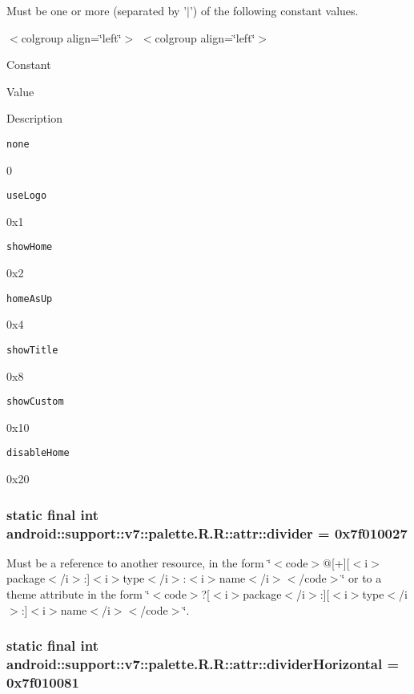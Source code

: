 Must be one or more (separated by '$|$') of the following constant values. \begin{TabularC}{0}
\hline
\end{TabularC}
$<$colgroup align=\char`\"{}left\char`\"{}$>$ $<$colgroup align=\char`\"{}left\char`\"{}$>$ 

Constant

Value

Description 

{\tt none}

0

{\tt useLogo}

0x1

{\tt showHome}

0x2

{\tt homeAsUp}

0x4

{\tt showTitle}

0x8

{\tt showCustom}

0x10

{\tt disableHome}

0x20\hypertarget{classandroid_1_1support_1_1v7_1_1palette_1_1_r_1_1attr_f76994e11ca97636ba703f13387a9aba}{
\subsubsection[{divider}]{\setlength{\rightskip}{0pt plus 5cm}static final int android::support::v7::palette.R.R::attr::divider = 0x7f010027}}
\label{classandroid_1_1support_1_1v7_1_1palette_1_1_r_1_1attr_f76994e11ca97636ba703f13387a9aba}


Must be a reference to another resource, in the form \char`\"{}$<$code$>$@\mbox{[}+\mbox{]}\mbox{[}$<$i$>$package$<$/i$>$:\mbox{]}$<$i$>$type$<$/i$>$:$<$i$>$name$<$/i$>$$<$/code$>$\char`\"{} or to a theme attribute in the form \char`\"{}$<$code$>$?\mbox{[}$<$i$>$package$<$/i$>$:\mbox{]}\mbox{[}$<$i$>$type$<$/i$>$:\mbox{]}$<$i$>$name$<$/i$>$$<$/code$>$\char`\"{}. \hypertarget{classandroid_1_1support_1_1v7_1_1palette_1_1_r_1_1attr_a17b4e390f34a0792d3fa726de45089a}{
\subsubsection[{dividerHorizontal}]{\setlength{\rightskip}{0pt plus 5cm}static final int android::support::v7::palette.R.R::attr::dividerHorizontal = 0x7f010081}}
\label{classandroid_1_1support_1_1v7_1_1palette_1_1_r_1_1attr_a17b4e390f34a0792d3fa726de45089a}


